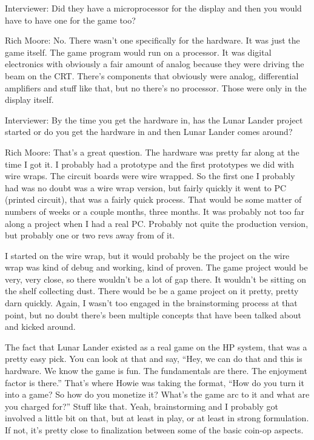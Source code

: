 \textcolor{interviewer}{Interviewer:} Did they have a microprocessor for the display and then you would have to have one for the game too?

\textcolor{interviewee}{Rich Moore:} No. There wasn't one specifically for the hardware. It was just the game itself. The game program would run on a processor. It was digital electronics with obviously a fair amount of analog because they were driving the beam on the CRT. There's components that obviously were analog, differential amplifiers and stuff like that, but no there's no processor. Those were only in the display itself.

\textcolor{interviewer}{Interviewer:} By the time you get the hardware in, has the Lunar Lander project started or do you get the hardware in and then Lunar Lander comes around?

\textcolor{interviewee}{Rich Moore:} That's a great question. The hardware was pretty far along at the time I got it. I probably had a prototype and the first prototypes we did with wire wraps. The circuit boards were wire wrapped. So the first one I probably had was no doubt was a wire wrap version, but fairly quickly it went to PC (printed circuit), that was a fairly quick process. That would be some matter of numbers of weeks or a couple months, three months. It was probably not too far along a project when I had a real PC. Probably not quite the production version, but probably one or two revs away from of it. 

I started on the wire wrap, but it would probably be the project on the wire wrap was kind of debug and working, kind of proven. The game project would be very, very close, so there wouldn't be a lot of gap there. It wouldn't be sitting on the shelf collecting dust. There would be be a game project on it pretty, pretty darn quickly. Again, I wasn't too engaged in the brainstorming process at that point, but no doubt there's been multiple concepts that have been talked about and kicked around.


The fact that Lunar Lander existed as a real game on the HP system, that was a pretty easy pick. You can look at that and say, “Hey, we can do that and this is hardware. We know the game is fun. The fundamentals are there. The enjoyment factor is there.” That's where Howie was taking the format, “How do you turn it into a game? So how do you monetize it? What's the game arc to it and what are you charged for?” Stuff like that. Yeah, brainstorming and I probably got involved a little bit on that, but at least in play, or at least in strong formulation. If not, it's pretty close to finalization between some of the basic coin-op aspects.

